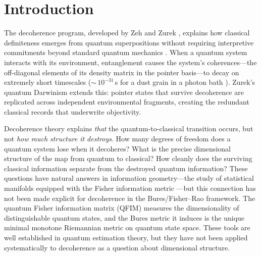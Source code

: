 \documentclass[12pt,a4paper]{article}
\theoremstyle{definition}
\theoremstyle{remark}
\begin{document}
\section{Introduction}
\label{sec:intro}

The decoherence program, developed by Zeh \cite{zeh1970interpretation} and Zurek \cite{zurek1981pointer,zurek2003decoherence}, explains how classical definiteness emerges from quantum superpositions without requiring interpretive commitments beyond standard quantum mechanics \cite{schlosshauer2005decoherence}.  When a quantum system interacts with its environment, entanglement causes the system's coherences---the off-diagonal elements of its density matrix in the pointer basis---to decay on extremely short timescales (${\sim}\,10^{-31}$\,s for a dust grain in a photon bath \cite{zurek2003decoherence}).  Zurek's quantum Darwinism \cite{zurek2025decoherence,riedel2010zurek} extends this: pointer states that survive decoherence are replicated across independent environmental fragments, creating the redundant classical records that underwrite objectivity.

Decoherence theory explains \emph{that} the quantum-to-classical transition occurs, but not \emph{how much structure it destroys}.  How many degrees of freedom does a quantum system lose when it decoheres?  What is the precise dimensional structure of the map from quantum to classical?  How cleanly does the surviving classical information separate from the destroyed quantum information?  These questions have natural answers in information geometry---the study of statistical manifolds equipped with the Fisher information metric \cite{rao1945information,chentsov1982statistical,amari1985differential}---but this connection has not been made explicit for decoherence in the Bures/Fisher--Rao framework.  The quantum Fisher information matrix (QFIM) \cite{liu2020quantum,braunstein1994statistical} measures the dimensionality of distinguishable quantum states, and the Bures metric it induces \cite{bures1969extension,uhlmann1976transition,petz1996monotone} is the unique minimal monotone Riemannian metric on quantum state space.  These tools are well established in quantum estimation theory, but they have not been applied systematically to decoherence as a question about dimensional structure.
\end{document}
